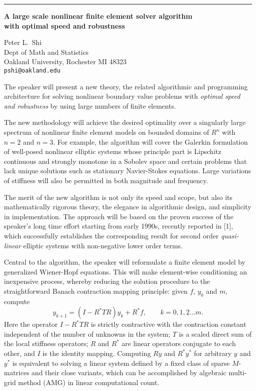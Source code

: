 \documentclass[twosided]{report}
\begin{document}
	\begin{center} \rule{6in}{1pt} \end{center}

\begin{center}
{\large			%
{\bf A large scale nonlinear finite element solver algorithm \\
	with optimal speed and robustness}}

	Peter L.~Shi \\
	Dept of Math and Statistics \\
	Oakland University, Rochester MI 48323 \\
	{\tt pshi@oakland.edu}
\end{center}
The speaker will present a new theory, the related
algorithmic and programming architecture for solving
nonlinear boundary value problems with {\it optimal speed
and robustness} by using large numbers of finite elements.

The new methodology will achieve the desired optimality
over a singularly large spectrum of nonlinear finite element
models on bounded domains of $R^n$ with $n=2$ and $n=3$.
For example,
the algorithm will cover the Galerkin formulation
of well-posed nonlinear elliptic systems whose principle
part is Lipschitz continuous and strongly monotone in a
Sobolev space and certain problems that lack unique
solutions such as stationary Navier-Stokes equations. Large
variations of stiffness will also be permitted in both
magnitude and frequency.

The merit of the new algorithm
is not only its speed and scope, but also its mathematically
rigorous theory, the elegance in algorithmic design, and
simplicity in implementation. The approach will be based on
the proven success of the speaker's long time effort
starting from early 1990s, recently reported in [1],
which successfully establishes the corresponding
result for second order {\it quasi-linear} elliptic systems
with non-negative lower order terms.

Central to the
algorithm, the speaker will reformulate a finite element
model by generalized Wiener-Hopf equations. This will make
element-wise conditioning an inexpensive process, whereby
reducing the solution procedure to the straightforward
Banach contraction mapping principle: given $f$, $y_0$ and
$m$, compute
$$ y_{k+1} = (I-R^* T R) y_k+ R^*f,
\qquad k=0,1,2\dots m. $$
Here the operator $I- R^* T R$ is
strictly contractive with the contraction constant
independent of the number of unknowns in the system; $T$ is
a scaled direct sum of the local stiffness operators; $R$
and $R^*$ are linear operators conjugate to each other, and
$I$ is the identity mapping. Computing $Ry$ and $R^* y^*$ for
arbitrary $y$ and $y^*$ is equivalent to solving a linear
system defined by a fixed class of sparse $M$-matrices and
their close variants, which can be accomplished by algebraic
multi-grid method (AMG) in linear computational count.
\end{document}
